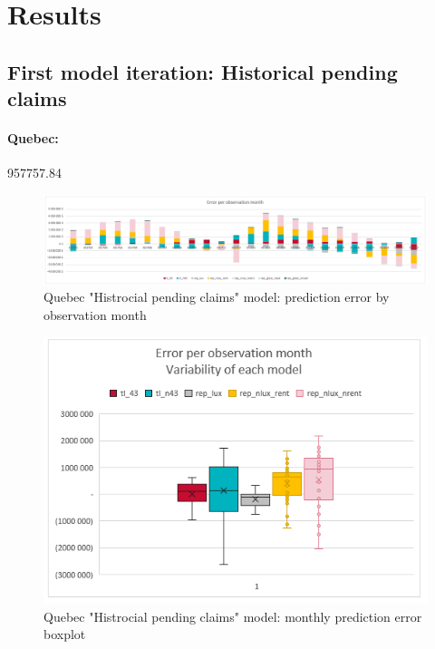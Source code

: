 \section{Results}\label{Sect_Results}
\subsection{First model iteration: Historical pending claims}
	\paragraph{Quebec:}
		957757.84
		\begin{figure}[H]
			\begin{center}
				\includegraphics[scale=0.2]{Graphiques/QC_current_model_by_month} 
				\renewcommand{\figurename}{Figure}
				\caption{Quebec "Histrocial pending claims" model: prediction error by observation month}\label{Fig_QC_current_er_by_month}
			\end{center}
		\end{figure}
		\begin{figure}[H]
			\begin{center}
				\includegraphics[scale=0.2]{Graphiques/QC_current_model_mustach} 
				\renewcommand{\figurename}{Figure}
				\caption{Quebec "Histrocial pending claims" model: monthly prediction error boxplot}\label{Fig_QC_current_er_boxplot}
			\end{center}
		\end{figure}
	

